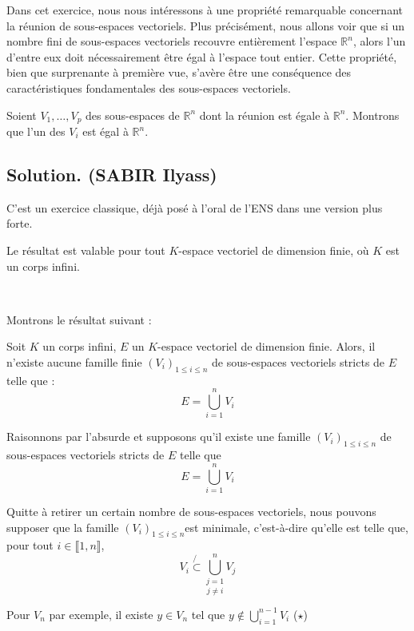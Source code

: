 Dans cet exercice, nous nous int{\'e}ressons {\`a} une propri{\'e}t{\'e}
remarquable concernant la r{\'e}union de sous-espaces vectoriels. Plus
pr{\'e}cis{\'e}ment, nous allons voir que si un nombre fini de sous-espaces
vectoriels recouvre enti{\`e}rement l'espace $\mathbb{R}^n$, alors l'un
d'entre eux doit n{\'e}cessairement {\^e}tre {\'e}gal {\`a} l'espace tout
entier. Cette propri{\'e}t{\'e}, bien que surprenante {\`a} premi{\`e}re vue,
s'av{\`e}re {\^e}tre une cons{\'e}quence des caract{\'e}ristiques
fondamentales des sous-espaces vectoriels.
\begin{exercise}[(Oral de l'X 2016)]
Soient $V_1, \ldots, V_p$ des sous-espaces de $\mathbb{R}^n$ dont la
r{\'e}union est {\'e}gale {\`a} $\mathbb{R}^n$. Montrons que l'un des $V_i$
est {\'e}gal {\`a} $\mathbb{R}^n$.

\end{exercise}

\subsection*{Solution. (SABIR Ilyass)}

C'est un exercice classique, d{\'e}j{\`a} pos{\'e} {\`a} l'oral de l'ENS dans
une version plus forte.

Le r{\'e}sultat est valable pour tout $K$-espace vectoriel de dimension finie,
o{\`u} $K$ est un corps infini.

\

Montrons le r{\'e}sultat suivant :

Soit $K$ un corps infini, $E$ un $K$-espace vectoriel de dimension finie.
Alors, il n'existe aucune famille finie $(V_i)_{1 \leqslant i \leqslant n}$ de
sous-espaces vectoriels stricts de $E$ telle que :
\[ E = \underset{i = 1}{\overset{n}{\bigcup}} V_i \]


Raisonnons par l'absurde et supposons qu'il existe une famille $(V_i)_{1
\leqslant i \leqslant n}$ de sous-espaces vectoriels stricts de $E$ telle que
\[ E = \underset{i = 1}{\overset{n}{\bigcup}} V_i \]


Quitte {\`a} retirer un certain nombre de sous-espaces vectoriels, nous
pouvons supposer que la famille $(V_i)_{1 \leqslant i \leqslant n} $est
minimale, c'est-{\`a}-dire qu'elle est telle que, pour tout $i \in \llbracket
1, n \rrbracket$,
\[ V_i \not{\subset} \underset{j \neq i}{\underset{j =
   1}{\overset{n}{\bigcup}}} V_j \]


Pour $V_n$ par exemple, il existe $y \in V_n$ tel que $y \nin \bigcup_{i =
1}^{n - 1} V_i$ ($\star$)

